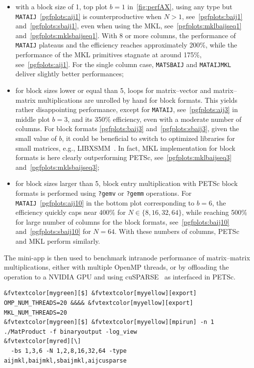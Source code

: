 \documentclass[3p,11pt]{elsarticle}
\newcommand{\pk}[1]{\texttt{#1}}
\begin{document}
\begin{itemize}
    \item with a block size of 1, top plot $b=1$ in~\cref{fig:perfAX}, using any type but \pk{MATAIJ}~\ref{pgfplots:aij1} is counterproductive when $N>1$, see~\ref{pgfplots:baij1} and~\ref{pgfplots:sbaij1}, even when using the MKL, see~\ref{pgfplots:mklbaijseq1} and~\ref{pgfplots:mklsbaijseq1}. With 8 or more columns, the performance of \pk{MATAIJ} plateaus and the efficiency reaches approximately 200\%, while the performance of the MKL primitives stagnate at around 175\%, see~\ref{pgfplots:aij1}.
For the single column case, \pk{MATSBAIJ} and \pk{MATAIJMKL} deliver slightly better performances;
    \item for block sizes lower or equal than 5, loops for matrix--vector and matrix--matrix multiplications are unrolled by hand for block formats. This yields rather disappointing performance, except for \pk{MATAIJ}, see~\ref{pgfplots:aij3} in middle plot $b=3$, and its 350\% efficiency, even with a moderate number of columns. For block formats \ref{pgfplots:baij3} and~\ref{pgfplots:sbaij3}, given the small value of $b$, it could be beneficial to switch to optimized libraries for small matrices, e.g., LIBXSMM~\cite{heinecke2016libxsmm}. In fact, MKL implementation for block formats is here clearly outperforming PETSc, see~\ref{pgfplots:mklbaijseq3} and~\ref{pgfplots:mklsbaijseq3};
    \item for block sizes larger than 5, block entry multiplication with PETSc block formats is performed using \texttt{?gemv} or \texttt{?gemm} operations. For \pk{MATAIJ}~\ref{pgfplots:aij10} in the bottom plot corresponding to $b=6$, the efficiency quickly caps near 400\% for $N\in\{8,16,32,64\}$, while reaching 500\% for large number of columns for the block formats, see~\ref{pgfplots:baij10} and~\ref{pgfplots:sbaij10} for $N=64$. With these numbers of columns, PETSc and MKL perform similarly.
\end{itemize}
The mini-app is then used to benchmark intranode performance of matrix--matrix
multiplications, either with multiple OpenMP threads, or by offloading the
operation to a NVIDIA GPU and using cuSPARSE~\cite{cusparse-web-page} as
interfaced in PETSc.
\begin{Verbatim}[fontsize=\footnotesize,frame=single,framerule=0.1mm,commandchars=&\[\]]
&fvtextcolor[mygreen][$] &fvtextcolor[myyellow][export] OMP_NUM_THREADS=20 &&&& &fvtextcolor[myyellow][export] MKL_NUM_THREADS=20
&fvtextcolor[mygreen][$] &fvtextcolor[myyellow][mpirun] -n 1 ./MatProduct -f binaryoutput -log_view                                 &fvtextcolor[myred][\]
  -bs 1,3,6 -N 1,2,8,16,32,64 -type aijmkl,baijmkl,sbaijmkl,aijcusparse
\end{Verbatim}
\end{document}
